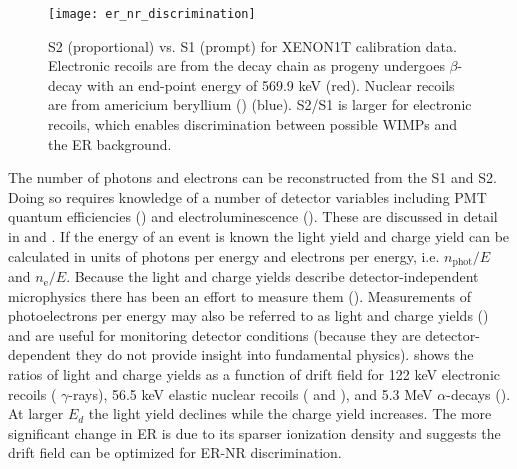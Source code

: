 \begin{figure}
\centering
\texttt{[image: er\_nr\_discrimination]}
\caption{S2 (proportional) vs. S1 (prompt) for XENON1T calibration data.  Electronic recoils are from the  decay chain as
progeny  undergoes $\beta$-decay with an end-point energy of 569.9 keV (red).  Nuclear
recoils are from americium beryllium () (blue).  S2/S1 is larger for electronic recoils, which enables discrimination
between possible WIMPs and the ER background.}
\label{fig:tpcs_signals_ernr}
\end{figure}

The number of photons and electrons can be reconstructed from the S1 and S2.  Doing so requires knowledge of a number of detector
variables including PMT quantum efficiencies () and electroluminescence
().  These are discussed in detail in  and
.  If the energy of an event is known the light yield and charge yield can be calculated
in units of photons per energy and electrons per energy, i.e. $n_{\mathrm{phot}}/E$ and $n_{\mathrm{e}}/E$.  Because the light and charge
yields describe detector-independent microphysics there has been an effort to measure them
().  Measurements of photoelectrons per energy may also be referred to as light and charge
yields () and are useful for monitoring detector conditions (because they are detector-dependent they do not
provide insight into fundamental physics).   shows the ratios of light and
charge yields as a function of drift field for 122 keV electronic recoils ( $\gamma$-rays), 56.5 keV elastic nuclear recoils
( and ), and
5.3 MeV $\alpha$-decays ().  At larger $E_d$ the light yield declines while the charge yield increases.  The more
significant change in ER is due to its sparser ionization density and suggests the drift field can be optimized for ER-NR discrimination.

